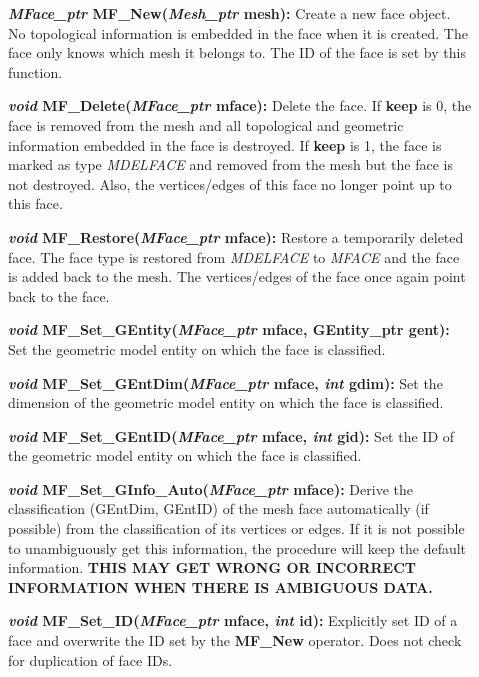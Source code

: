 \documentclass[12pt]{article}
\begin{document}
\begin{description}
\item[]{\bf {\em MFace\_ptr} MF\_New({\em Mesh\_ptr} mesh):} Create
a new face object. No topological information is embedded in the face
when it is created. The face only knows which mesh it belongs
to. The ID of the face is set by this function.

\item[]{\bf {\em void} MF\_Delete({\em MFace\_ptr} mface):}
  Delete the face. If {\bf keep} is 0, the face is removed from the
  mesh and all topological and geometric information embedded in the
  face is destroyed. If {\bf keep} is 1, the face is marked as type
  {\em MDELFACE} and removed from the mesh but the face is not
  destroyed. Also, the vertices/edges of this face no longer point up
  to this face.
    
\item[]{\bf {\em void} MF\_Restore({\em MFace\_ptr}
    mface):} Restore a temporarily deleted face. The face type is
  restored from {\em MDELFACE} to {\em MFACE} and the face is
  added back to the mesh. The vertices/edges of the face once again point
  back to the face.

\item[]
  
\item[]{\bf {\em void} MF\_Set\_GEntity({\em MFace\_ptr} mface, GEntity\_ptr gent):} Set the geometric model entity on which the face is classified.

\item[]{\bf {\em void} MF\_Set\_GEntDim({\em MFace\_ptr} mface,
{\em int} gdim):} Set the dimension of the geometric model entity on
which the face is classified.

\item[]{\bf {\em void} MF\_Set\_GEntID({\em MFace\_ptr} mface,
{\em int} gid):} Set the ID of the geometric model entity on which
the face is classified.

\item[]{\bf {\em void} MF\_Set\_GInfo\_Auto({\em MFace\_ptr} mface):}
  Derive the classification (GEntDim, GEntID) of the mesh face
  automatically (if possible) from the classification of its
  vertices or edges. If it is not possible to unambiguously get this
  information, the procedure will keep the default information. {\bf THIS
  MAY GET WRONG OR INCORRECT INFORMATION WHEN THERE IS AMBIGUOUS
  DATA.}


\item[]{\bf {\em void} MF\_Set\_ID({\em MFace\_ptr} mface,
{\em int} id):} Explicitly set ID of a face and overwrite the ID
set by the {\bf MF\_New} operator. Does not check for duplication of face
IDs.


\end{description}
\end{document}
